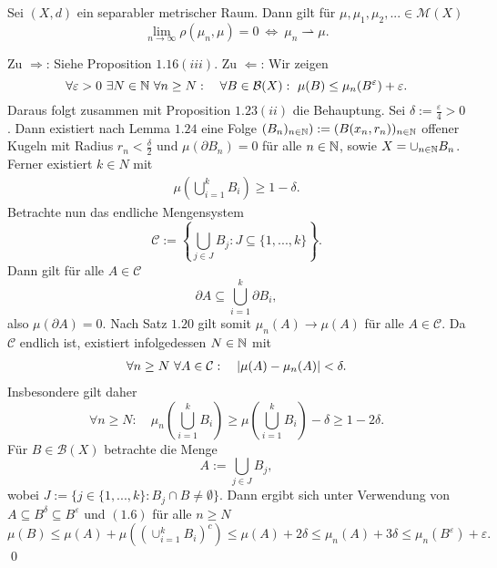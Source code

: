 \begin{theorem}
    Sei $(X,d)$ ein separabler metrischer Raum. Dann gilt für $\mu, \mu_1, \mu_2, ... \in \mathcal{M}(X)$
    $$
        \lim_{n \to \infty} \rho(\mu_n, \mu) = 0 \ \iff \ \mu_n \rightharpoonup \mu.  
    $$
\end{theorem}

\begin{proof*}
    Zu $\Rightarrow$: Siehe Proposition $1.16(iii)$.
    \newline 
    Zu $\Leftarrow$:  Wir zeigen
    $$
        \forall \varepsilon > 0 \ \exists N \in \N \ \forall n \geq N: \quad \forall B \in \mathcal{B}(X): \  \mu(B) \leq \mu_n(B^{\varepsilon}) + \varepsilon. 
    $$
    Daraus folgt zusammen mit Proposition $1.23(ii)$ die Behauptung. Sei $\delta := \frac{\varepsilon}{4} > 0$. 
    Dann existiert nach Lemma $1.24$ eine Folge $(B_n)_{n \in \mathbb{N}}) := (B(x_n, r_n))_{n \in \mathbb{N}}$ offener Kugeln mit Radius $r_n < \frac{\delta}{2}$  
    und $\mu(\partial B_n) = 0$ für alle $n \in \mathbb{N}$, sowie $X = \cup_{n \in  \mathbb{N}}B_n$. Ferner existiert $k \in N$ mit
    \begin{align}
        \mu\left(\bigcup_{i=1}^k B_i\right) \geq 1 - \delta. 
    \end{align}
    Betrachte nun das endliche Mengensystem 
    $$
        \mathcal{C} := \left\{ \bigcup_{j \in J}B_j : J \subseteq \{1,...,k\}\right\}. 
    $$
    Dann gilt für alle $A \in \mathcal{C}$
    $$
        \partial A \subseteq \bigcup_{i=1}^k \partial B_i,
    $$
    also $\mu(\partial A) = 0$. Nach Satz $1.20$ gilt somit $\mu_n(A) \to \mu(A)$ für alle $A \in \mathcal{C}$. Da $\mathcal{C}$ endlich ist, existiert infolgedessen $N \in \mathbb{N}$ mit
    \begin{align}
        \forall n \geq N \ \forall A \in \mathcal{C}: \quad \left| \mu(A) - \mu_n(A) \right| < \delta. 
    \end{align}
    Insbesondere gilt daher
    $$
        \forall n \geq N: \quad \mu_n\left(\bigcup_{i=1}^k B_i\right) \geq \mu\left(\bigcup_{i=1}^k B_i\right) - \delta \geq 1 - 2\delta. 
    $$
    Für $B \in \mathcal{B}(X)$ betrachte die Menge 
    $$
        A := \bigcup_{j \in J} B_j,
    $$
    wobei $J := \{j \in \{1,...,k\}: B_j \cap B \neq \emptyset \}$. Dann ergibt sich unter Verwendung von $A \subseteq B^{\delta} \subseteq B^{\varepsilon}$ und $(1.6)$ für alle $n \geq N$ 
    $$
        \mu(B) \leq \mu(A) + \mu\left((\cup_{i=1}^k B_i)^c\right) \leq \mu(A) + 2\delta \leq \mu_n(A) + 3\delta \leq \mu_n(B^{\varepsilon}) + \varepsilon. 
    $$
    \qed
    
\end{proof*}
